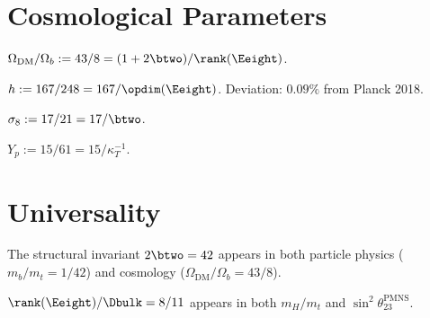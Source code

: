 \section{Cosmological Parameters}

\begin{definition}\label{def:DM_b}
    \leanok
    $\Omega_{\mathrm{DM}} / \Omega_b := 43/8 = (1 + 2\btwo) / \rank(\Eeight)$.
\end{definition}

\begin{definition}\label{def:hubble_h}
    \leanok
    $h := 167/248 = 167/\opdim(\Eeight)$.
    Deviation: $0.09\%$ from Planck 2018.
\end{definition}

\begin{definition}[$\sigma_8$]\label{def:sigma8}
    \leanok
    $\sigma_8 := 17/21 = 17/\btwo$.
\end{definition}

\begin{definition}\label{def:Yp}
    \leanok
    $Y_p := 15/61 = 15/\kappa_T^{-1}$.
\end{definition}

\section{Universality}

\begin{theorem}\label{thm:42_universality}
    \leanok
    The structural invariant $2\btwo = 42$ appears in both particle physics
    ($m_b/m_t = 1/42$) and cosmology ($\Omega_{\mathrm{DM}}/\Omega_b = 43/8$).
\end{theorem}

\begin{theorem}[8/11 Universality]\label{thm:8_11_universality}
    \leanok
    $\rank(\Eeight)/\Dbulk = 8/11$ appears in both $m_H/m_t$ and $\sin^2\theta_{23}^{\mathrm{PMNS}}$.
\end{theorem}


